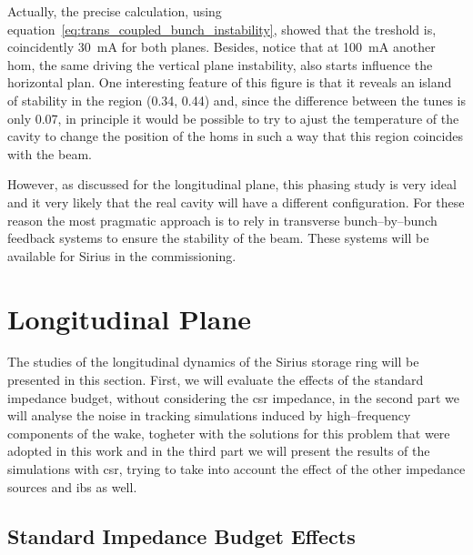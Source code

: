     Actually, the precise calculation, using equation~\eqref{eq:trans_coupled_bunch_instability}, showed that the treshold is, coincidently \SI{30}{\milli\ampere} for both planes. Besides, notice that at \SI{100}{\milli\ampere} another \gls{hom}, the same driving the vertical plane instability, also starts influence the horizontal plan. One interesting feature of this figure is that it reveals an island of stability in the region (0.34, 0.44) and, since the difference between the tunes is only \SI{0.07}{}, in principle it would be possible to try to ajust the temperature of the cavity to change the position of the \glspl{hom} in such a way that this region coincides with the beam.

    However, as discussed for the longitudinal plane, this phasing study is very ideal and it very likely that the real cavity will have a different configuration. For these reason the most pragmatic approach is to rely in transverse bunch--by--bunch feedback systems to ensure the stability of the beam. These systems will be available for Sirius in the commissioning.

\section{Longitudinal Plane}\label{sec:longitudinal_plane}

    The studies of the longitudinal dynamics of the Sirius storage ring will be presented in this section. First, we will evaluate the effects of the standard impedance budget, without considering the \gls{csr} impedance, in the second part we will analyse the noise in tracking simulations induced by high--frequency components of the wake, togheter with the solutions for this problem that were adopted in this work and in the third part we will present the results of the simulations with \gls{csr}, trying to take into account the effect of the other impedance sources and \gls{ibs} as well.

\subsection{Standard Impedance Budget Effects}\label{ssec:imp_bud_effects}

